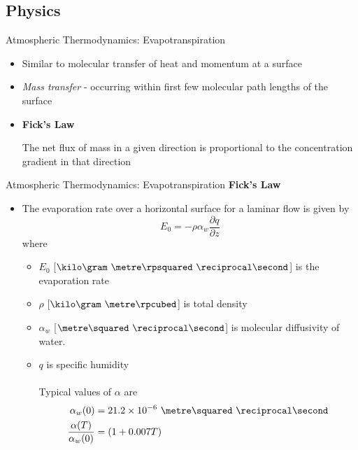 \subsection{Physics}

\begin{frame}{Atmospheric Thermodynamics: Evapotranspiration}
\begin{itemize}
	\item Similar to molecular transfer of heat and momentum at a surface
	\item \textit{Mass transfer} - occurring within first few molecular path lengths of the surface
	\item \textbf{Fick's Law}
	\begin{fancydefs}
		The net flux of mass in a given direction is proportional to the concentration gradient in that direction
	\end{fancydefs}
\end{itemize}
\end{frame}

\begin{frame}{Atmospheric Thermodynamics: Evapotranspiration}
\textbf{Fick's Law}
\begin{itemize}
	\item The evaporation rate over a horizontal surface for a laminar flow is given by
	$$E_0 = -\rho \alpha_w\frac{\partial q}{\partial z}$$
	where
	\begin{itemize}
		\item $E_0$ [$\kilo\gram\ \metre\rpsquared\ \reciprocal\second$] is the evaporation rate
		\item $\rho$ [$\kilo\gram\ \metre\rpcubed$] is total density
		\item $\alpha_w$ [$\metre\squared\ \reciprocal\second$] is molecular diffusivity of water.
		\item $q$ is specific humidity\\~\\Typical values of $\alpha$ are
		\begin{align*}
			\alpha_w(0) &= 21.2\times10^{-6}\ \metre\squared\ \reciprocal\second\\
			\frac{\alpha(T)}{\alpha_w(0)} &= (1 + 0.007T) 
		\end{align*} 
	\end{itemize}
\end{itemize}
\end{frame}


